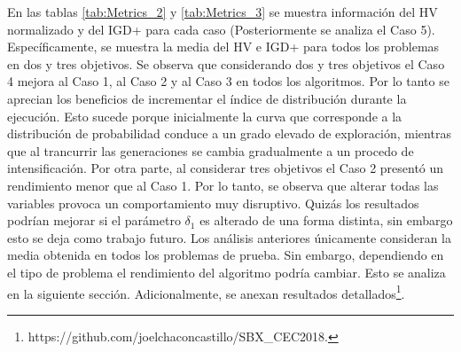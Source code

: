 En las tablas \ref{tab:Metrics_2} y \ref{tab:Metrics_3} se muestra información del HV normalizado \cite{zitzler1999multiobjective} y del IGD+ \cite{Joel:IGDPlus_And_GDPlus} para cada caso (Posteriormente se analiza el Caso 5).
%
Específicamente, se muestra la media del HV e IGD+ para todos los problemas en dos y tres objetivos.
%
Se observa que considerando dos y tres objetivos el Caso 4 mejora al Caso 1, al Caso 2 y al Caso 3 en todos los algoritmos.
%
Por lo tanto se aprecian los beneficios de incrementar el índice de distribución durante la ejecución.
%
Esto sucede porque inicialmente la curva que corresponde a la distribución de probabilidad conduce a un grado elevado de exploración, mientras que al trancurrir las generaciones se cambia gradualmente a un procedo de intensificación.
%
Por otra parte, al considerar tres objetivos el Caso 2 presentó un rendimiento menor que al Caso 1.
%
Por lo tanto, se observa que alterar todas las variables provoca un comportamiento muy disruptivo.
%
Quizás los resultados podrían mejorar si el parámetro $\delta_1$ es alterado de una forma distinta, sin embargo esto se deja como trabajo futuro.
Los análisis anteriores únicamente consideran la media obtenida en todos los problemas de prueba.
%
Sin embargo, dependiendo en el tipo de problema el rendimiento del algoritmo podría cambiar.
%
Esto se analiza en la siguiente sección.
%
Adicionalmente, se anexan resultados detallados\footnote{https:\//\//github.com\//joelchaconcastillo\//SBX\_CEC2018.}.


